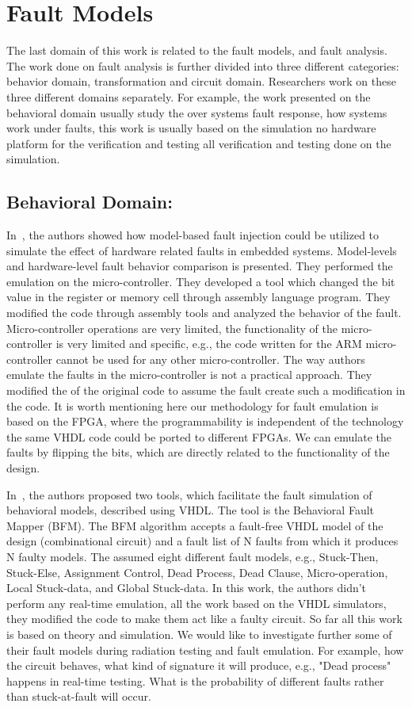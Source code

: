 \section{Fault Models}
The last domain of this work is related to the fault models, and fault analysis. The work done on fault analysis is further divided into three different categories: behavior domain, transformation and circuit domain. Researchers work on these three different domains separately. For example, the work presented on the behavioral domain usually study the over systems fault response, how systems work under faults, this work is usually based on the simulation no hardware platform for the verification and testing all verification and testing done on the simulation.

\subsection{Behavioral Domain:}
\label{faultmodels}
In~\citep{svenningsson2010model}, the authors showed how model-based fault injection could be utilized to
simulate the effect of hardware related faults in embedded systems. Model-levels and hardware-level
fault behavior comparison is presented. They performed the emulation on the micro-controller. They developed a tool which changed the bit value in the register or memory cell through assembly language program. They modified the code through assembly tools and analyzed the behavior of the fault. Micro-controller operations are very limited, the functionality of the micro-controller is very limited and specific, e.g., the code written for the ARM micro-controller cannot be used for any other micro-controller. The way authors emulate the faults in the micro-controller is not a practical approach. They modified the  of the original code to assume the fault create such a modification in the code. It is worth mentioning here our methodology for fault emulation is based on the FPGA, where the programmability is independent of the technology the same VHDL code could be ported to different FPGAs. We can emulate the faults by flipping the bits, which are directly related to the functionality of the design.

In~\citep{hayne1999behavioral}, the authors proposed two tools, which facilitate the fault simulation of behavioral
models, described using VHDL. The tool is the Behavioral Fault Mapper (BFM). The BFM algorithm
accepts a fault-free VHDL model of the design (combinational circuit) and a fault list of N faults from
which it produces N faulty models. The assumed eight different fault models, e.g., Stuck-Then, Stuck-Else,
Assignment Control, Dead Process, Dead Clause, Micro-operation, Local Stuck-data, and Global Stuck-data.  In this work, the authors didn't perform any real-time emulation, all the work based on the VHDL simulators, they modified the code to make them act like a  faulty circuit. So far all this work is based on theory and simulation. We would like to investigate further some of their fault models during radiation testing and fault emulation. For example, how the circuit behaves, what kind of signature it will produce, e.g.,  "Dead process" happens in real-time testing.  What is the probability of different faults rather than stuck-at-fault will occur.

